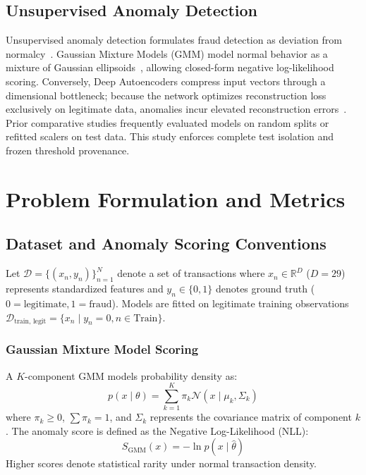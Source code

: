\documentclass[conference]{IEEEtran}
\begin{document}
\subsection{Unsupervised Anomaly Detection}
Unsupervised anomaly detection formulates fraud detection as deviation from normalcy~\cite{chandola2009}. Gaussian Mixture Models (GMM) model normal behavior as a mixture of Gaussian ellipsoids~\cite{reynolds2009}, allowing closed-form negative log-likelihood scoring. Conversely, Deep Autoencoders compress input vectors through a dimensional bottleneck; because the network optimizes reconstruction loss exclusively on legitimate data, anomalies incur elevated reconstruction errors~\cite{an2015}. Prior comparative studies frequently evaluated models on random splits or refitted scalers on test data. This study enforces complete test isolation and frozen threshold provenance.

\section{Problem Formulation and Metrics}
\subsection{Dataset and Anomaly Scoring Conventions}
Let $\mathcal{D} = \{(x_n, y_n)\}_{n=1}^N$ denote a set of transactions where $x_n \in \mathbb{R}^D$ ($D=29$) represents standardized features and $y_n \in \{0, 1\}$ denotes ground truth ($0 = \text{legitimate}, 1 = \text{fraud}$). Models are fitted on legitimate training observations $\mathcal{D}_{\text{train, legit}} = \{x_n \mid y_n = 0, n \in \text{Train}\}$.

\subsubsection{Gaussian Mixture Model Scoring}
A $K$-component GMM models probability density as:
\begin{equation}
p(x \mid \theta) = \sum_{k=1}^K \pi_k \mathcal{N}(x \mid \mu_k, \Sigma_k)
\end{equation}
where $\pi_k \ge 0$, $\sum \pi_k = 1$, and $\Sigma_k$ represents the covariance matrix of component $k$. The anomaly score is defined as the Negative Log-Likelihood (NLL):
\begin{equation}
S_{\text{GMM}}(x) = -\ln p(x \mid \hat{\theta})
\end{equation}
Higher scores denote statistical rarity under normal transaction density.
\end{document}
